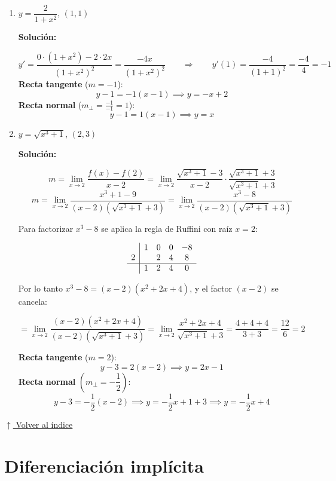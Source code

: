 \documentclass[12pt]{article}
\newcommand{\solucion}{%
    \vspace{0.8em}%
    \textbf{Solución:}%
}
\newcommand{\volverindice}{%
    \vspace{1em}%
    \begin{flushright}%
        \hyperlink{indice}{\small $\uparrow$ Volver al índice}%
    \end{flushright}%
}
\begin{document}
\begin{enumerate}[label=\alph*.-]
    \item $y = \dfrac{2}{1+x^2}$, \quad $(1, 1)$

    \solucion
    \[
    y' = \frac{0 \cdot (1+x^2) - 2 \cdot 2x}{(1+x^2)^2} = \frac{-4x}{(1+x^2)^2}
    \qquad \Rightarrow \qquad y'(1) = \frac{-4}{(1+1)^2} = \frac{-4}{4} = -1
    \]
    \textbf{Recta tangente} ($m = -1$):
    \[
    y - 1 = -1(x-1) \implies \boxed{y = -x + 2}
    \]
    \textbf{Recta normal} ($m_\perp = \frac{-1}{-1} = 1$):
    \[
    y - 1 = 1(x-1) \implies \boxed{y = x}
    \]

    \item $y = \sqrt{x^3 + 1}$, \quad $(2, 3)$

    \solucion
    \[
    m = \lim_{x \to 2} \frac{f(x) - f(2)}{x-2}
    = \lim_{x \to 2} \frac{\sqrt{x^3+1} - 3}{x-2}
    \cdot \frac{\sqrt{x^3+1}+3}{\sqrt{x^3+1}+3}
    \]
    \[
    m = \lim_{x \to 2} \frac{x^3 + 1 - 9}{(x-2)(\sqrt{x^3+1}+3)}
    = \lim_{x \to 2} \frac{x^3 - 8}{(x-2)(\sqrt{x^3+1}+3)}
    \]

    Para factorizar $x^3 - 8$ se aplica la regla de Ruffini con raíz $x = 2$:

    \[
    \begin{array}{c|cccc}
        & 1 & 0 & 0 & -8 \\
      2 &   & 2 & 4 &  8 \\
      \hline
        & 1 & 2 & 4 &  0 \\
    \end{array}
    \]

    Por lo tanto $x^3 - 8 = (x-2)(x^2+2x+4)$, y el factor $(x-2)$ se cancela:

    \[
    = \lim_{x \to 2} \frac{(x-2)(x^2+2x+4)}{(x-2)(\sqrt{x^3+1}+3)}
    = \lim_{x \to 2} \frac{x^2+2x+4}{\sqrt{x^3+1}+3}
    = \frac{4+4+4}{3+3} = \frac{12}{6} = 2
    \]

    \textbf{Recta tangente} ($m = 2$):
    \[
    y - 3 = 2(x-2) \implies \boxed{y = 2x - 1}
    \]
    \textbf{Recta normal} $\left(m_\perp = -\dfrac{1}{2}\right)$:
    \[
    y - 3 = -\frac{1}{2}(x-2) \implies y = -\frac{1}{2}x + 1 + 3 \implies \boxed{y = -\frac{1}{2}x + 4}
    \]

\end{enumerate}

\volverindice
\newpage

\section{Diferenciación implícita}
\end{document}
